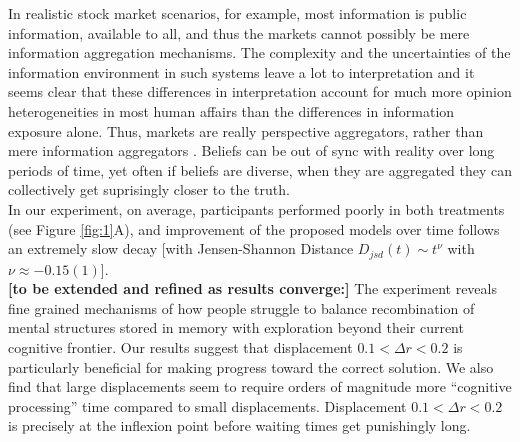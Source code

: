 In realistic stock market scenarios, for example, most information is public information, available to all, and thus the markets cannot possibly be mere information aggregation mechanisms. The complexity and the uncertainties of the information environment in such systems leave a lot to interpretation and it seems clear that these differences in interpretation account for much more opinion heterogeneities in most human affairs than the differences in information exposure alone. Thus, markets are really perspective aggregators, rather than mere information aggregators \cite{hong2009interpreted}. Beliefs can be out of sync with reality over long periods of time, yet often if beliefs are diverse, when they are aggregated they can collectively get suprisingly closer to the truth. \\


In our experiment, on average, participants performed poorly in both treatments (see Figure \ref{fig:1}A), and improvement of the proposed models over time follows an extremely slow decay [with Jensen-Shannon Distance $D_{jsd}(t) \sim t^{\nu}$ with $ \nu \approx -0.15(1)$]. \\

{\bf [to be extended and refined as results converge:]} The experiment reveals fine grained mechanisms of how people struggle to balance recombination of mental structures stored in memory with exploration beyond their current cognitive frontier.  Our results suggest that displacement $0.1 < \Delta r < 0.2 $ is particularly beneficial for making progress toward the correct solution. We also find that large displacements seem to require orders of magnitude more ``cognitive processing'' time compared to small displacements. Displacement $0.1 < \Delta r < 0.2 $ is precisely at the inflexion point before waiting times get punishingly long.\\

